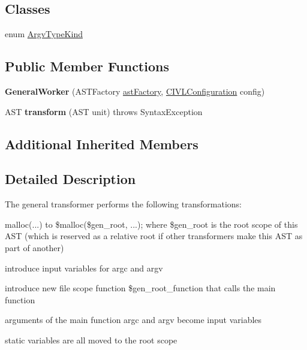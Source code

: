 \subsection*{Classes}
\begin{DoxyCompactItemize}
\item 
enum \hyperlink{enumedu_1_1udel_1_1cis_1_1vsl_1_1civl_1_1transform_1_1common_1_1GeneralWorker_1_1ArgvTypeKind}{Argv\+Type\+Kind}
\end{DoxyCompactItemize}
\subsection*{Public Member Functions}
\begin{DoxyCompactItemize}
\item 
\hypertarget{classedu_1_1udel_1_1cis_1_1vsl_1_1civl_1_1transform_1_1common_1_1GeneralWorker_ad1659d905e1fa2f1e5e0b30ec7904c87}{}{\bfseries General\+Worker} (A\+S\+T\+Factory \hyperlink{classedu_1_1udel_1_1cis_1_1vsl_1_1civl_1_1transform_1_1common_1_1BaseWorker_a44812bb476e4511fb6ca29a808427186}{ast\+Factory}, \hyperlink{classedu_1_1udel_1_1cis_1_1vsl_1_1civl_1_1config_1_1IF_1_1CIVLConfiguration}{C\+I\+V\+L\+Configuration} config)\label{classedu_1_1udel_1_1cis_1_1vsl_1_1civl_1_1transform_1_1common_1_1GeneralWorker_ad1659d905e1fa2f1e5e0b30ec7904c87}

\item 
\hypertarget{classedu_1_1udel_1_1cis_1_1vsl_1_1civl_1_1transform_1_1common_1_1GeneralWorker_af0394cdbbfd5cb32c14139006805405e}{}A\+S\+T {\bfseries transform} (A\+S\+T unit)  throws Syntax\+Exception \label{classedu_1_1udel_1_1cis_1_1vsl_1_1civl_1_1transform_1_1common_1_1GeneralWorker_af0394cdbbfd5cb32c14139006805405e}

\end{DoxyCompactItemize}
\subsection*{Additional Inherited Members}


\subsection{Detailed Description}
The general transformer performs the following transformations\+: 


\begin{DoxyItemize}
\item malloc(...) to \$malloc(\$gen\+\_\+root, ...); where \$gen\+\_\+root is the root scope of this A\+S\+T (which is reserved as a relative root if other transformers make this A\+S\+T as part of another) 
\item introduce input variables for argc and argv 
\item introduce new file scope function \$gen\+\_\+root\+\_\+function that calls the main function 
\item arguments of the main function argc and argv become input variables 
\item static variables are all moved to the root scope 
\end{DoxyItemize}

